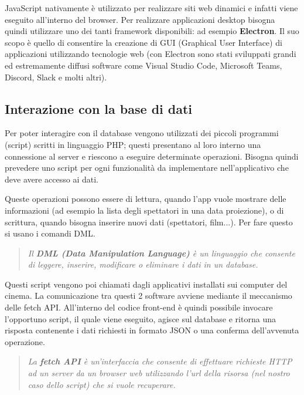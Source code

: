 \documentclass{article}
\begin{document}
JavaScript nativamente è utilizzato per realizzare siti web dinamici e infatti viene eseguito all'interno del browser. Per realizzare applicazioni desktop bisogna quindi utilizzare uno dei tanti framework disponibili: ad esempio \textbf{Electron}. Il suo scopo è quello di consentire la creazione di GUI (Graphical User Interface) di applicazioni utilizzando tecnologie web (con Electron sono stati sviluppati grandi ed estremamente diffusi software come Visual Studio Code, Microsoft Teams, Discord, Slack e molti altri).

\subsection{Interazione con la base di dati}\label{sec:InterazioneBaseDati}
Per poter interagire con il database vengono utilizzati dei piccoli programmi (script) scritti in linguaggio PHP; questi presentano al loro interno una connessione al server e riescono a eseguire determinate operazioni.
Bisogna quindi prevedere uno script per ogni funzionalità da implementare nell'applicativo che deve avere accesso ai dati.

Queste operazioni possono essere di lettura, quando l'app vuole mostrare delle informazioni (ad esempio la lista degli spettatori in una data proiezione), o di scrittura, quando bisogna inserire nuovi dati (spettatori, film...). Per fare questo si usano i comandi DML.

\begin{quote}
    \begin{Cit}
    \textit{
    Il \textbf{DML (Data Manipulation Language)} è un linguaggio che consente di leggere, inserire, modificare o eliminare i dati in un database.}
    \end{Cit}
    \end{quote}
    
Questi script vengono poi chiamati dagli applicativi installati sui computer del cinema. La comunicazione tra questi 2 software avviene mediante il meccanismo delle fetch API. All'interno del codice front-end è quindi possibile invocare l'opportuno script, il quale viene eseguito, agisce sul database e ritorna una risposta contenente i dati richiesti in formato JSON o una conferma dell'avvenuta operazione.

\begin{quote}
    \begin{Cit}
    \textit{
    La \textbf{fetch API} è un'interfaccia che consente di effettuare richieste HTTP ad un server da un browser web utilizzando l'url della risorsa (nel nostro caso dello script) che si vuole recuperare.}
    \end{Cit}
    \end{quote}
\end{document}
